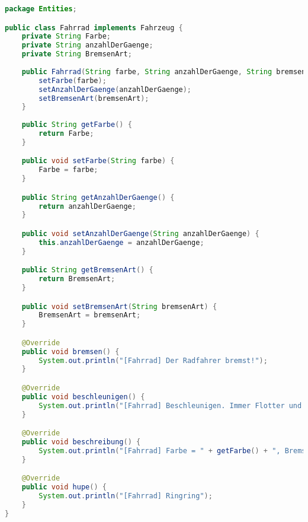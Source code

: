 \begin{lstlisting}[language=java, style=java, caption={Fahrrad.java},
label={lst:lst3}]
package Entities;

public class Fahrrad implements Fahrzeug {
	private String Farbe;
	private String anzahlDerGaenge;
	private String BremsenArt;
	
	public Fahrrad(String farbe, String anzahlDerGaenge, String bremsenArt) {
		setFarbe(farbe);
		setAnzahlDerGaenge(anzahlDerGaenge);
		setBremsenArt(bremsenArt);
	}
	
	public String getFarbe() {
		return Farbe;
	}

	public void setFarbe(String farbe) {
		Farbe = farbe;
	}

	public String getAnzahlDerGaenge() {
		return anzahlDerGaenge;
	}

	public void setAnzahlDerGaenge(String anzahlDerGaenge) {
		this.anzahlDerGaenge = anzahlDerGaenge;
	}

	public String getBremsenArt() {
		return BremsenArt;
	}

	public void setBremsenArt(String bremsenArt) {
		BremsenArt = bremsenArt;
	}

	@Override
	public void bremsen() {
		System.out.println("[Fahrrad] Der Radfahrer bremst!");
	}

	@Override
	public void beschleunigen() {
		System.out.println("[Fahrrad] Beschleunigen. Immer Flotter und immer weiter, so der Radfahrer heiter!");
	}

	@Override
	public void beschreibung() {
		System.out.println("[Fahrrad] Farbe = " + getFarbe() + ", BremsenArt = " + getBremsenArt() + ", Anzahl der Gänge = " + getAnzahlDerGaenge());
	}

	@Override
	public void hupe() {
		System.out.println("[Fahrrad] Ringring");	
	}
}
\end{lstlisting}


